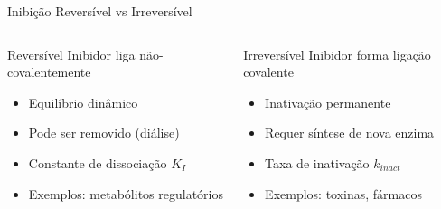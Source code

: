 \begin{frame}[shrink=15]{Inibição Reversível vs Irreversível}
\begin{columns}
\begin{block}{Reversível}
Inibidor liga não-covalentemente
\begin{itemize}
    \item Equilíbrio dinâmico
    \item Pode ser removido (diálise)
    \item Constante de dissociação $K_I$
    \item Exemplos: metabólitos regulatórios
\end{itemize}
\end{block}


\begin{block}{Irreversível}
Inibidor forma ligação covalente
\begin{itemize}
    \item Inativação permanente
    \item Requer síntese de nova enzima
    \item Taxa de inativação $k_{inact}$
    \item Exemplos: toxinas, fármacos
\end{itemize}
\end{block}

\end{columns}

\vspace{0.3cm}

\end{frame}

